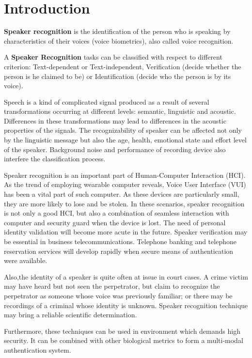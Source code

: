 

\section{Introduction}
\textbf{Speaker recognition} is the identification of the person who is speaking by characteristics
of their voices (voice biometrics), also called voice recognition. \cite{SRwiki}

A \textbf{Speaker Recognition} tasks can be classified with respect to different criterion:
Text-dependent or Text-independent, Verification (decide whether the person is he claimed to be) or
Identification (decide who the person is by its voice).\cite{SRwiki}

Speech is a kind of complicated signal produced as a result of several transformations occurring at
different levels: semantic, linguistic and acoustic.
Differences in these transformations may lead to differences in the acoustic properties of the signals.
The recognizability of speaker can be affected not only by the linguistic message
but also the age, health, emotional state and effort level of the speaker.
Background noise and performance of recording device also interfere
the classification process.

Speaker recognition is an important part of Human-Computer Interaction (HCI).
As the trend of employing wearable computer reveals,
Voice User Interface (VUI) has been a vital part of such computer.
As these devices are particularly small, they are more likely to lose and be stolen.
In these scenarios, speaker recognition is not only a good HCI,
but also a combination of seamless interaction with computer and security guard
when the device is lost.
The need of personal identity validation will become more acute in the future.
Speaker verification may be essential in business telecommunications.
Telephone banking and telephone reservation services will develop rapidly
when secure means of authentication were available.

Also,the identity of a speaker is quite often at issue in court cases.
A crime victim may have heard but not seen the perpetrator,
but claim to recognize the perpetrator as someone whose voice was previously familiar;
or there may be recordings of a criminal whose identity is unknown.
Speaker recognition technique may bring a reliable scientific determination.

Furthermore, these techniques can be used in environment which demands high security.
It can be combined with other biological metrics to form a multi-modal authentication system.

